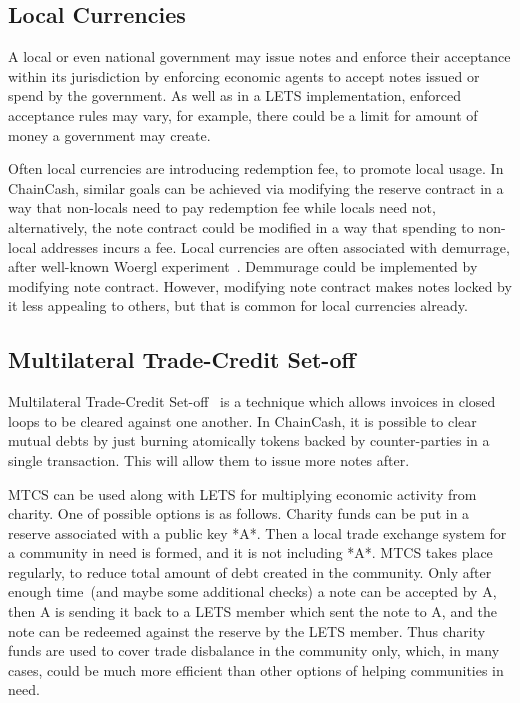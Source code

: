 \documentclass{llncs}   %
\newcommand{\cc}{ChainCash}
\begin{document}
\subsection{Local Currencies}

A local or even national government may issue notes and enforce their acceptance within its jurisdiction by enforcing economic agents to accept notes issued or spend by the government. As well as in a LETS implementation, enforced acceptance rules may vary, for example, there
could be a limit for amount of money a government may create.

Often local currencies are introducing redemption fee, to promote local usage. In \cc{}, similar goals can be achieved via modifying the reserve contract in a way that non-locals need to pay redemption fee while locals need not, alternatively, the note contract could be modified in a way that spending to non-local addresses incurs a fee. Local currencies are often associated with demurrage, after well-known Woergl experiment~\cite{unterguggenbercer1934end}. Demmurage could be implemented by modifying note contract. However, modifying note contract makes notes locked by it less appealing to others, but that is common for local currencies already.

\subsection{Multilateral Trade-Credit Set-off}

Multilateral Trade-Credit Set-off~\cite{bottazzi2024multilateral} is a technique which allows invoices in closed loops to be cleared against one another.
In \cc{}, it is possible to clear mutual debts by just burning atomically tokens backed by counter-parties in a single
transaction. This will allow them to issue more notes after.

MTCS can be used along with LETS for multiplying economic activity from charity. One of possible options is as follows.
Charity funds can be put in a reserve associated with a public key *A*. Then a local trade exchange system for a community
in need is formed, and it is not including *A*. MTCS takes place regularly, to reduce total amount of debt created in the
community. Only after enough time~(and maybe some additional checks) a note can be accepted by A, then A is sending it back to
a LETS member which sent the note to A, and the note can be redeemed against the reserve by the LETS member. Thus
charity funds are used to cover trade disbalance in the community only, which, in many cases, could be much more efficient
than other options of helping communities in need.
\end{document}
